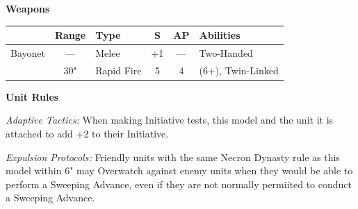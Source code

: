 \begin{minipage}[t]{0.72\textwidth}
	\vspace*{2em}
	\textbf{Weapons}
	
	\begin{tabular}{L{90 pt} c C{40pt} *{2}{c} >{\raggedright\arraybackslash}p{130pt}}
		& Range & Type & S & AP & Abilities \\
		\hline
		Bayonet & — & Melee & +1 & — & Two-Handed \\
		 & 30" & Rapid Fire & 5 & 4 &  (6+), Twin-Linked \\	
	\end{tabular}

	
	\vspace*{2em}
	\textbf{Unit Rules}

	\textit{Adaptive Tactics:} When making Initiative tests, this model and the unit it is attached to add +2 to their Initiative.

	\textit{Expulsion Protocols:} Friendly units with the same Necron Dynasty rule as this model within 6" may Overwatch against enemy units when they would be able to perform a Sweeping Advance, even if they are not normally permiited to conduct a Sweeping Advance.

\end{minipage}
\hspace{0.5em}



\newpage
\subsubsection[Vargard]{}

